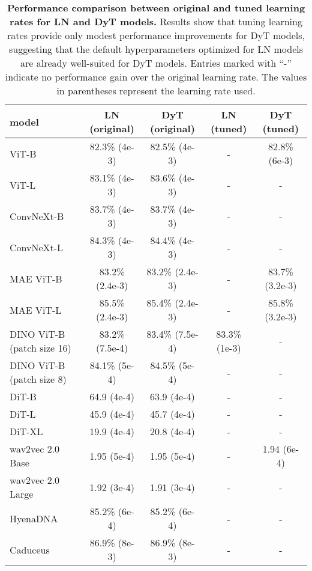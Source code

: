 \begin{table}[h]
\centering
{}
\begin{tabular}{lcccc}
\toprule
model & LN (original) & DyT (original) & LN (tuned) & DyT (tuned)  \\
\midrule
ViT-B & 82.3\% \scriptsize{(4e-3)} & {82.5\%} \scriptsize{(4e-3)} & - & {82.8\%} \scriptsize{(6e-3)} \\
ViT-L & 83.1\% \scriptsize{(4e-3)} & {83.6\%} \scriptsize{(4e-3)} & - & - \\
ConvNeXt-B & 83.7\% \scriptsize{(4e-3)} & 83.7\% \scriptsize{(4e-3)} & - & - \\
ConvNeXt-L & 84.3\% \scriptsize{(4e-3)} & {84.4\%} \scriptsize{(4e-3)} & - & - \\
\midrule
MAE ViT-B & 83.2\% \scriptsize{(2.4e-3)} & 83.2\% \scriptsize{(2.4e-3)} & - & 83.7\% \scriptsize{(3.2e-3)} \\
MAE ViT-L & {85.5\%} \scriptsize{(2.4e-3)} & 85.4\% \scriptsize{(2.4e-3)} & - & {85.8\%} \scriptsize{(3.2e-3)} \\
DINO ViT-B (patch size 16) & 83.2\% \scriptsize{(7.5e-4)} & {83.4\%} \scriptsize{(7.5e-4)} & 83.3\% \scriptsize{(1e-3)} & - \\
DINO ViT-B (patch size 8) & 84.1\% \scriptsize{(5e-4)} & {84.5\%} \scriptsize{(5e-4)} & - & - \\
\midrule
DiT-B & 64.9 \scriptsize{(4e-4)} & {63.9} \scriptsize{(4e-4)} & - & - \\
DiT-L & {45.9} \scriptsize{(4e-4)} & 45.7 \scriptsize{(4e-4)} & - & - \\
DiT-XL & {19.9} \scriptsize{(4e-4)}  & 20.8 \scriptsize{(4e-4)} & - & - \\
\midrule
wav2vec 2.0 Base & 1.95 \scriptsize{(5e-4)} & 1.95 \scriptsize{(5e-4)} & - & {1.94} \scriptsize{(6e-4)} \\
wav2vec 2.0 Large & 1.92 \scriptsize{(3e-4)} & {1.91} \scriptsize{(3e-4)} & - & - \\
\midrule
HyenaDNA & 85.2\% \scriptsize{(6e-4)} & 85.2\% \scriptsize{(6e-4)} & - & - \\
Caduceus & 86.9\% \scriptsize{(8e-3)} & 86.9\% \scriptsize{(8e-3)} &  - & - \\
\midrule
  \end{tabular}
\caption{\textbf{Performance comparison between original and tuned learning rates for LN and DyT models.} Results show that tuning learning rates provide only modest performance improvements for DyT models, suggesting that the default hyperparameters optimized for LN models are already well-suited for DyT models. Entries marked with ``-'' indicate no performance gain over the original learning rate. The values in parentheses represent the learning rate used. 
}
\label{table:tuned_lr}
\end{table}



